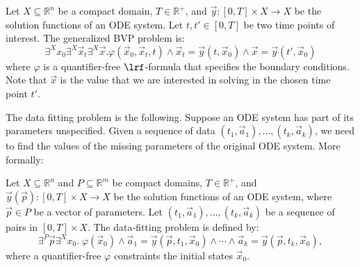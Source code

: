 \documentclass[11pt]{article}
\begin{document}
\begin{definition}
Let $X\subseteq \mathbb{R}^n$ be a compact domain, $T\in \mathbb{R}^+$, and $\vec y: [0,T]\times X\rightarrow X$ be the solution functions of an ODE system. Let $t, t'\in [0,T]$ be two time points of interest. The generalized BVP problem is:
$$
\exists^{X} x_0\exists^{X}\vec x_t\exists^X \vec x.\varphi(\vec x_{0},\vec x_t,t)\wedge \vec x_t = \vec y(t,\vec x_0)\wedge \vec x = \vec y(t',\vec x_0)
$$
where $\varphi$ is a quantifier-free $\lrf$-formula that specifies the boundary conditions. Note that $\vec x$ is the value that we are interested in solving in the chosen time point $t'$.
\end{definition}

The data fitting problem is the following. Suppose an ODE system has part of its parameters unspecified. Given a sequence of data $(t_1, \vec a_1), ..., (t_k, \vec a_k)$, we need to find the values of the missing parameters of the original ODE system. More formally:
\begin{definition}
Let $X\subseteq \mathbb{R}^n$ and $P\subseteq \mathbb{R}^m$ be compact domains, $T\in \mathbb{R}^+$, and $\vec y(\vec p): [0,T]\times X\rightarrow X$ be the solution functions of an ODE system, where $\vec p\in P$ be a vector of parameters. Let $(t_1,\vec a_1), ..., (t_k, \vec a_k)$ be a sequence of pairs in $[0,T]\times X$. The data-fitting problem is defined by:
$$\exists^P \vec p\exists^X x_0.\; \varphi(\vec x_0)\wedge \vec a_1 = \vec y(\vec p, t_1, \vec x_0)\wedge \cdots \wedge \vec a_k = \vec y(\vec p, t_k, \vec x_0),$$
where a quantifier-free $\varphi$ constraints the initial states $\vec x_0$. 
\end{definition}
\end{document}
